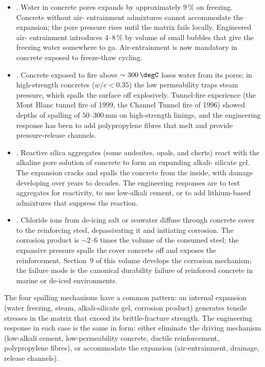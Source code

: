 \begin{itemize}[leftmargin=*]
\item {}. Water in concrete pores expands
  by approximately $9\,\%$ on freezing. Concrete without air-
  entrainment admixtures cannot accommodate the expansion; the pore
  pressure rises until the matrix fails locally. Engineered air-
  entrainment introduces $4$--$8\,\%$ by volume of small bubbles that
  give the freezing water somewhere to go. Air-entrainment is now
  mandatory in concrete exposed to freeze-thaw cycling.
\item {}. Concrete exposed to fire above
  $\sim 300\,\degC$ loses water from its pores; in high-strength
  concretes ($w/c < 0.35$) the low permeability traps steam pressure,
  which spalls the surface off explosively. Tunnel-fire experience (the
  Mont Blanc tunnel fire of 1999, the Channel Tunnel fire of 1996)
  showed depths of spalling of $50$--$300\,\text{mm}$ on high-strength
  linings, and the engineering response has been to add polypropylene
  fibres that melt and provide pressure-release channels.
\item {}. Reactive silica
  aggregates (some andesites, opals, and cherts) react with the
  alkaline pore solution of concrete to form an expanding alkali-
  silicate gel. The expansion cracks and spalls the concrete from the
  inside, with damage developing over years to decades. The
  engineering responses are to test aggregates for reactivity, to use
  low-alkali cement, or to add lithium-based admixtures that suppress
  the reaction.
\item {}. Chloride
  ions from de-icing salt or seawater diffuse through concrete cover
  to the reinforcing steel, depassivating it and initiating corrosion.
  The corrosion product is $\sim 2$--$6$ times the volume of the
  consumed steel; the expansive pressure spalls the cover concrete
  off and exposes the reinforcement. Section~9 of this volume develops
  the corrosion mechanism; the failure mode is the canonical
  durability failure of reinforced concrete in marine or de-iced
  environments.
\end{itemize}

The four spalling mechanisms have a common pattern: an internal
expansion (water freezing, steam, alkali-silicate gel, corrosion
product) generates tensile stresses in the matrix that exceed its
brittle-fracture strength. The engineering response in each case is
the same in form: either eliminate the driving mechanism (low-alkali
cement, low-permeability concrete, ductile reinforcement, polypropylene
fibres), or accommodate the expansion (air-entrainment, drainage,
release channels).


